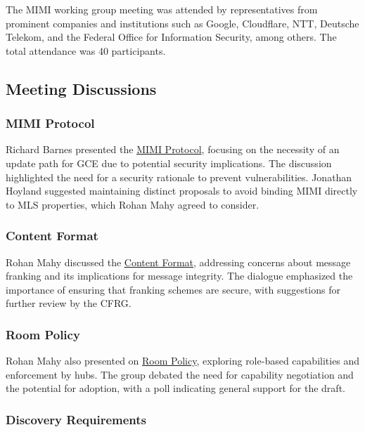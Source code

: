\documentclass{article}
\begin{document}
The MIMI working group meeting was attended by representatives from prominent companies and institutions such as Google, Cloudflare, NTT, Deutsche Telekom, and the Federal Office for Information Security, among others. The total attendance was 40 participants.

\subsection{Meeting Discussions}

\subsubsection{MIMI Protocol}

Richard Barnes presented the \href{https://www.ietf.org/archive/id/draft-ietf-mimi-protocol-02.html}{MIMI Protocol}, focusing on the necessity of an update path for GCE due to potential security implications. The discussion highlighted the need for a security rationale to prevent vulnerabilities. Jonathan Hoyland suggested maintaining distinct proposals to avoid binding MIMI directly to MLS properties, which Rohan Mahy agreed to consider.

\subsubsection{Content Format}

Rohan Mahy discussed the \href{https://www.ietf.org/archive/id/draft-ietf-mimi-content-04.html}{Content Format}, addressing concerns about message franking and its implications for message integrity. The dialogue emphasized the importance of ensuring that franking schemes are secure, with suggestions for further review by the CFRG.

\subsubsection{Room Policy}

Rohan Mahy also presented on \href{https://datatracker.ietf.org/doc/draft-mahy-mimi-room-policy/01/}{Room Policy}, exploring role-based capabilities and enforcement by hubs. The group debated the need for capability negotiation and the potential for adoption, with a poll indicating general support for the draft.

\subsubsection{Discovery Requirements}
\end{document}
